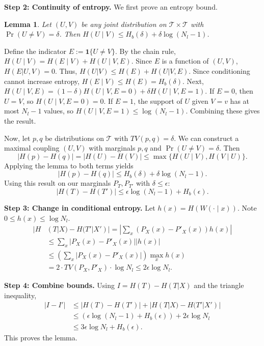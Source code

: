 \documentclass[conference]{IEEEtran}
\newtheorem{lemma}{Lemma}
\begin{document}
\begin{IEEEproof}
\textbf{Step 2: Continuity of entropy.}
We first prove an entropy bound.
\begin{lemma}
Let $(U,V)$ be any joint distribution on $\mathcal{T}\times\mathcal{T}$ with $\Pr(U\neq V)=\delta$. Then $H(U\mid V) \le H_b(\delta) + \delta\log(N_l-1)$.
\end{lemma}
\begin{IEEEproof}
Define the indicator $E:=\mathbf{1}\{U\neq V\}$. By the chain rule, $H(U\mid V) = H(E\mid V) + H(U\mid V,E)$. Since $E$ is a function of $(U,V)$, $H(E|U,V)=0$. Thus, $H(U|V) \le H(E) + H(U|V,E)$. Since conditioning cannot increase entropy, $H(E\mid V)\le H(E)=H_b(\delta)$.
Next, $H(U\mid V,E) = (1-\delta)H(U\mid V,E=0) + \delta H(U\mid V,E=1)$.
If $E=0$, then $U=V$, so $H(U\mid V,E=0)=0$. If $E=1$, the support of $U$ given $V=v$ has at most $N_l-1$ values, so $H(U\mid V,E=1)\le \log(N_l-1)$.
Combining these gives the result.
\end{IEEEproof}
Now, let $p,q$ be distributions on $\mathcal{T}$ with $TV(p,q)=\delta$. We can construct a maximal coupling $(U,V)$ with marginals $p,q$ and $\Pr(U\neq V)=\delta$. Then
\begin{equation}
|H(p)-H(q)| = |H(U)-H(V)| \le \max\{H(U\mid V),H(V\mid U)\}.
\end{equation}
Applying the lemma to both terms yields
\begin{equation}
|H(p)-H(q)| \le H_b(\delta) + \delta\log(N_l-1).
\end{equation}
Using this result on our marginals $P_T, P_{T'}$ with $\delta \le \epsilon$:
\begin{equation}
|H(T)-H(T')| \le \epsilon \log(N_l-1) + H_b(\epsilon). \label{eq:marg_bound_final}
\end{equation}

\textbf{Step 3: Change in conditional entropy.}
Let $h(x)=H(W(\cdot\mid x))$. Note $0\le h(x)\le \log N_l$.
\begin{align}
    |H&(T|X) - H(T'|X')| = \left|\sum_x (P_X(x) - P'_{X}(x))h(x)\right| \nonumber \\
    &\le \sum_x |P_X(x) - P'_{X}(x)| |h(x)| \nonumber \\
    &\le \left( \sum_x |P_X(x) - P'_{X}(x)| \right) \max_x h(x) \nonumber \\
    &= 2 \cdot TV(P_X, P'_{X}) \cdot \log N_l \le 2\epsilon \log N_l.
\end{align}

\textbf{Step 4: Combine bounds.}
Using $I=H(T)-H(T|X)$ and the triangle inequality,
\begin{align}
|I-I'| &\le |H(T)-H(T')| + |H(T|X)-H(T'|X')| \\
&\le (\epsilon\log(N_l-1) + H_b(\epsilon)) + 2\epsilon\log N_l \\
&\le 3\epsilon\log N_l + H_b(\epsilon).
\end{align}
This proves the lemma.
\end{IEEEproof}
\end{document}
